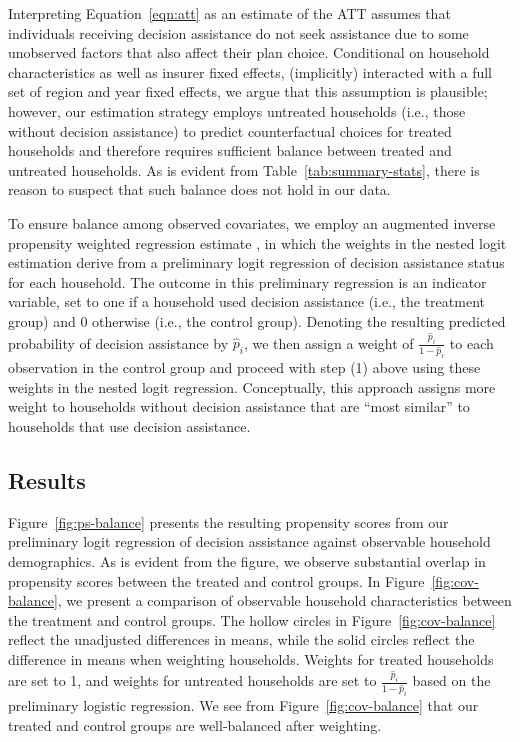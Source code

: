 \documentclass[12pt]{article}
\begin{document}
Interpreting Equation~\eqref{eqn:att} as an estimate of the ATT assumes that individuals receiving decision assistance do not seek assistance due to some unobserved factors that also affect their plan choice. Conditional on household characteristics as well as insurer fixed effects, (implicitly) interacted with a full set of region and year fixed effects, we argue that this assumption is plausible; however, our estimation strategy employs untreated households (i.e., those without decision assistance) to predict counterfactual choices for treated households and therefore requires sufficient balance between treated and untreated households. As is evident from Table~\ref{tab:summary-stats}, there is reason to suspect that such balance does not hold in our data.

To ensure balance among observed covariates, we employ an augmented inverse propensity weighted regression estimate \cite{wooldridge2010}, in which the weights in the nested logit estimation derive from a preliminary logit regression of decision assistance status for each household. The outcome in this preliminary regression is an indicator variable, set to one if a household used decision assistance (i.e., the treatment group) and 0 otherwise (i.e., the control group). Denoting the resulting predicted probability of decision assistance by $\hat{p}_{i}$, we then assign a weight of $\frac{\hat{p}_{i}}{1-\hat{p}_{i}}$ to each observation in the control group and proceed with step (1) above using these weights in the nested logit regression. Conceptually, this approach assigns more weight to households without decision assistance that are ``most similar'' to households that use decision assistance.


\subsection{Results}
\label{subsec:causal-results}

Figure~\ref{fig:ps-balance} presents the resulting propensity scores from our preliminary logit regression of decision assistance against observable household demographics. As is evident from the figure, we observe substantial overlap in propensity scores between the treated and control groups. In Figure~\ref{fig:cov-balance}, we present a comparison of observable household characteristics between the treatment and control groups. The hollow circles in Figure~\ref{fig:cov-balance} reflect the unadjusted differences in means, while the solid circles reflect the difference in means when weighting households. Weights for treated households are set to 1, and weights for untreated households are set to  $\frac{\hat{p}_{i}}{1-\hat{p}_{i}}$ based on the preliminary logistic regression.  We see from Figure~\ref{fig:cov-balance} that our treated and control groups are well-balanced after weighting.
\end{document}
